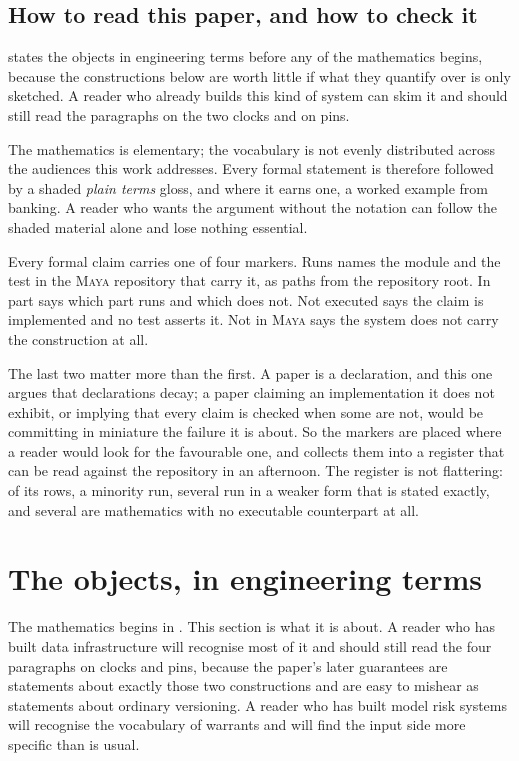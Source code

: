 \documentclass[11pt,a4paper]{article}
\renewcommand{\_}{\oldunderscore\allowbreak}
\theoremstyle{plain}
\theoremstyle{definition}
\theoremstyle{definition}
\theoremstyle{remark}
\begin{document}
\subsection{How to read this paper, and how to check it}

 states the objects in engineering terms before any of the mathematics begins, because
the constructions below are worth little if what they quantify over is only sketched. A reader who
already builds this kind of system can skim it and should still read the paragraphs on the two clocks
and on pins.

The mathematics is elementary; the vocabulary is not evenly distributed across the audiences this work
addresses. Every formal statement is therefore followed by a shaded \emph{plain terms} gloss, and where
it earns one, a worked example from banking. A reader who wants the argument without the notation can
follow the shaded material alone and lose nothing essential.

Every formal claim carries one of four markers. \textsf{Runs} names the module and the test in the
\textsc{Maya} repository that carry it, as paths from the repository root. \textsf{In part} says which
part runs and which does not. \textsf{Not executed} says the claim is implemented and no test asserts
it. \textsf{Not in \textsc{Maya}} says the system does not carry the construction at all.

The last two matter more than the first. A paper is a declaration, and this one argues that declarations
decay; a paper claiming an implementation it does not exhibit, or implying that every claim is checked
when some are not, would be committing in miniature the failure it is about. So the markers are placed
where a reader would look for the favourable one, and  collects them into a register that
can be read against the repository in an afternoon. The register is not flattering: of its rows, a
minority run, several run in a weaker form that is stated exactly, and several are mathematics with no
executable counterpart at all.
\section{The objects, in engineering terms}\label{sec:objects}

The mathematics begins in . This section is what it is about. A reader who has built
data infrastructure will recognise most of it and should still read the four paragraphs on clocks and
pins, because the paper's later guarantees are statements about exactly those two constructions and are
easy to mishear as statements about ordinary versioning. A reader who has built model risk systems will
recognise the vocabulary of warrants and will find the input side more specific than is usual.
\end{document}

